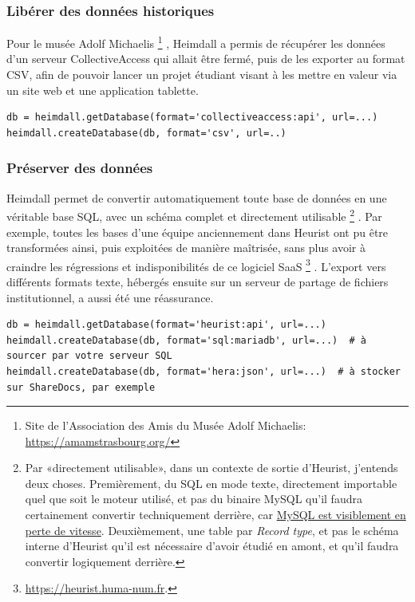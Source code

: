 \documentclass[final,fra]{anthology-ch}         %
\begin{document}
\subsubsection{Libérer des données historiques}\label{libuxe9rer-des-donnuxe9es-historiques}

Pour le musée Adolf Michaelis%
    \footnote{Site de l'Association des Amis du Musée Adolf Michaelis: \url{https://amamstrasbourg.org/}}%
, Heimdall a permis de récupérer les données d'un serveur CollectiveAccess qui allait être fermé, puis de les exporter au format CSV, afin de pouvoir lancer un projet étudiant visant à les mettre en valeur via un site web et une application tablette.

\begin{verbatim}
db = heimdall.getDatabase(format='collectiveaccess:api', url=...)
heimdall.createDatabase(db, format='csv', url=..)
\end{verbatim}

\subsubsection{Préserver des données}\label{pruxe9server-des-donnuxe9es}

Heimdall permet de convertir automatiquement toute base de données en une véritable base SQL, avec un schéma complet et directement utilisable%
    \footnote{Par «directement utilisable», dans un contexte de sortie d'Heurist, j'entends deux choses. Premièrement, du SQL en mode texte, directement importable quel que soit le moteur utilisé, et pas du binaire MySQL qu'il faudra certainement convertir techniquement
  derrière, car \href{https://db-engines.com/en/ranking_trend/system/MySQL}{MySQL est visiblement en perte de vitesse}. Deuxièmement, une table par \emph{Record type}, et pas le schéma interne d'Heurist qu'il est nécessaire d'avoir étudié en amont, et qu'il faudra convertir logiquement derrière.}%
. Par exemple, toutes les bases d'une équipe anciennement dans Heurist ont pu être transformées ainsi, puis exploitées de manière maîtrisée, sans plus avoir à craindre les régressions et indisponibilités de ce logiciel SaaS
    \footnote{\url{https://heurist.huma-num.fr}.}%
. L'export vers différents formats texte, hébergés ensuite sur un serveur de partage de fichiers institutionnel, a aussi été une réassurance.

\begin{verbatim}
db = heimdall.getDatabase(format='heurist:api', url=...)
heimdall.createDatabase(db, format='sql:mariadb', url=...)  # à sourcer par votre serveur SQL
heimdall.createDatabase(db, format='hera:json', url=...)  # à stocker sur ShareDocs, par exemple
\end{verbatim}
\end{document}

